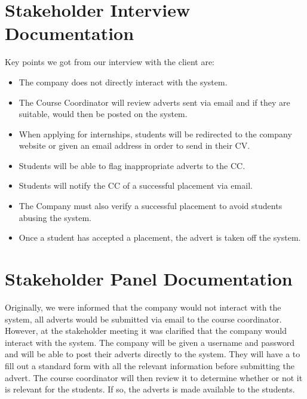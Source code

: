 \documentclass{l3deliverable}
\begin{document}
\section{Stakeholder Interview Documentation}

Key points we got from our interview with the client are:

\begin{itemize}
\item The company does not directly interact with the system.
\item The Course Coordinator will review adverts sent via email and if they are suitable, would
then be posted on the system.
\item When applying for internships, students will be redirected to the company website or given
an email address in order to send in their CV.
\item Students will be able to flag inappropriate adverts to the CC.
\item Students will notify the CC of a successful placement via email.
\item The Company must also verify a successful placement to avoid students abusing the
system.
\item Once a student has accepted a placement, the advert is taken off the system.
\end{itemize}

\section{Stakeholder Panel Documentation}

Originally, we were informed that the company would not interact with the system, all adverts
would be submitted via email to the course coordinator. However, at the stakeholder meeting
it was clarified that the company would interact with the system. The company will be given a
username and password and will be able to post their adverts directly to the system. They will
have a to fill out a standard form with all the relevant information before submitting the advert.
The course coordinator will then review it to determine whether or not it is relevant for the
students. If so, the adverts is made available to the students.
\end{document}
